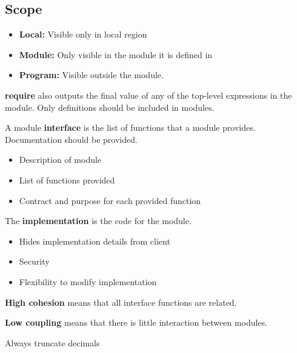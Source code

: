 \documentclass[english, 12pt]{article}
\begin{document}
\subsection{Scope}
\begin{itemize}
\item \textbf{Local:} Visible only in local region
\item \textbf{Module:} Only visible in the module it is defined in
\item \textbf{Program:} Visible outside the module.
\end{itemize}
\begin{qte}
\textbf{require} also outputs the final value of any of the top-level expressions in the module. Only definitions should be included in modules.
\end{qte}
\begin{defn}
A module \textbf{interface} is the list of functions that a module provides. Documentation should be provided.
\begin{itemize}
\item Description of module
\item List of functions provided
\item Contract and purpose for each provided function
\end{itemize}
\end{defn}
\begin{defn}
The \textbf{implementation} is the code for the module.
\begin{itemize}
\item Hides implementation details from client
\item Security
\item Flexibility to modify implementation
\end{itemize}
\end{defn}

\begin{defn}
\textbf{High cohesion} means that all interface functions are related.
\end{defn}
\begin{defn}
\textbf{Low coupling} means that there is little interaction between modules.
\end{defn}

\begin{defn}
Always truncate decimals
\end{defn}
\end{document}
